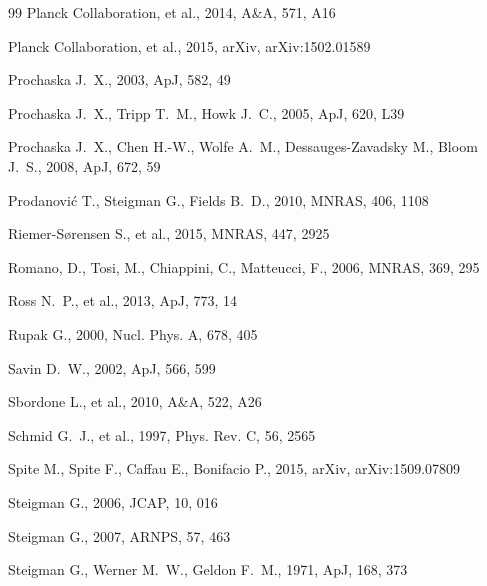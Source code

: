\documentclass[12pt,preprint,useAMS,usenatbib]{emulateapj}
\begin{document}
\begin{thebibliography}{99}
Planck Collaboration, et al., 2014, A\&A, 571, A16

Planck Collaboration, et al., 2015, arXiv, arXiv:1502.01589

Prochaska J.~X., 2003, ApJ, 582, 49

Prochaska J.~X., Tripp T.~M., Howk J.~C., 2005, ApJ, 620, L39

Prochaska J.~X., Chen H.-W., Wolfe A.~M., Dessauges-Zavadsky M., Bloom J.~S., 2008, ApJ, 672, 59

Prodanovi{\'c} T., Steigman G., Fields B.~D., 2010, MNRAS, 406, 1108

Riemer-S{\o}rensen S., et al., 2015, MNRAS, 447, 2925

Romano, D., Tosi, M., Chiappini, C., Matteucci, F., 2006, MNRAS, 369, 295

Ross N.~P., et al., 2013, ApJ, 773, 14

Rupak G., 2000, Nucl. Phys. A, 678, 405

Savin D.~W., 2002, ApJ, 566, 599

Sbordone L., et al., 2010, A\&A, 522, A26

Schmid G.~J., et al., 1997, Phys. Rev. C, 56, 2565

Spite M., Spite F., Caffau E., Bonifacio P., 2015, arXiv, arXiv:1509.07809

Steigman G., 2006, JCAP, 10, 016

Steigman G., 2007, ARNPS, 57, 463

Steigman G., Werner M.~W., Geldon F.~M., 1971, ApJ, 168, 373


\end{thebibliography}
\end{document}
